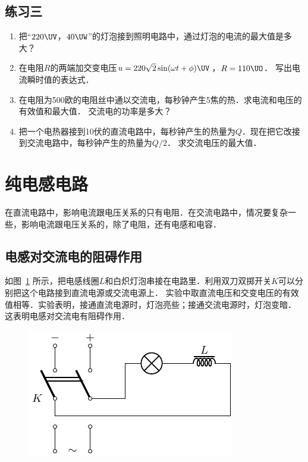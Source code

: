 \subsection*{练习三}
\begin{enumerate}
    \item 把“$220 \UV $，$ 40\UW$”的灯泡接到照明电路中，通过灯泡的电流的最大值是多大？
    \item 在电阻$R$的两端加交变电压$u=220\sqrt{2}\sin(\omega t+\phi) \UV $，$R=110 \UO$．
    写出电流瞬时值的表达式．
    \item 在电阻为500欧的电阻丝中通以交流电，每秒钟产生5焦的热．求电流和电压的有效值和最大值．
    交流电的功率是多大？
    \item 把一个电热器接到10伏的直流电路中，每秒钟产生的热量为$Q$．现在把它改接到交流电路中，每秒钟产生的热量为$Q/2$．
    求交流电压的最大值．
\end{enumerate}

\section{纯电感电路}
在直流电路中，影响电流跟电压关系的只有电阻．在交流电路中，情况要复杂一些，影响电流跟电压关系的，除了电阻，还有电感和电容．	
	
\subsection{电感对交流电的阻碍作用} 


如图~\ref{fig_C_3-14} 所示，把电感线圈$L$和白炽灯泡串接在电路里．利用双刀双掷开关$K$可以分别把这个电路接到直流电源或交流电源上．
实验中取直流电压和交变电压的有效值相等．实验表明，接通直流电源时，灯泡亮些；接通交流电源时，灯泡变暗．
这表明电感对交流电有阻碍作用．

\begin{figure}[htbp]
	\centering
	\includegraphics{fig/C/3-14.pdf}
	\caption{}\label{fig_C_3-14}
\end{figure}


